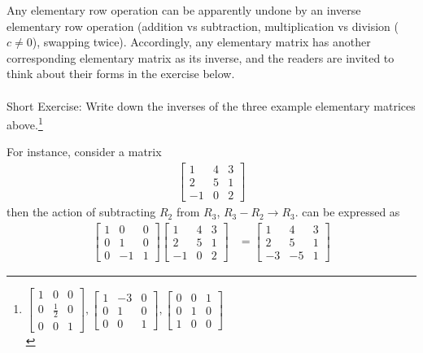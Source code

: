 Any elementary row operation can be apparently undone by an inverse elementary row operation (addition vs subtraction, multiplication vs division ($c \neq 0$), swapping twice). Accordingly, any elementary matrix has another corresponding elementary matrix as its inverse, and the readers are invited to think about their forms in the exercise below. \\
\\
Short Exercise: Write down the inverses of the three example elementary matrices above.\footnote{$
\begin{bmatrix}
1 & 0 & 0 \\
0 & \frac{1}{2} & 0 \\
0 & 0 & 1
\end{bmatrix},
\begin{bmatrix}
1 & -3 & 0 \\
0 & 1 & 0 \\
0 & 0 & 1
\end{bmatrix},
\begin{bmatrix}
0 & 0 & 1 \\
0 & 1 & 0 \\
1 & 0 & 0
\end{bmatrix}
$\\}\par
For instance, consider a matrix
\begin{align*}
\begin{bmatrix}
1 & 4 & 3 \\
2 & 5 & 1 \\
-1 & 0 & 2
\end{bmatrix}     
\end{align*}
then the action of subtracting $R_2$ from $R_3$, $R_3 - R_2 \to R_3$. can be expressed as
\begin{align*}
\begin{bmatrix}
1 & 0 & 0 \\
0 & 1 & 0 \\
0 & -1 & 1
\end{bmatrix} 
\begin{bmatrix}
1 & 4 & 3 \\
2 & 5 & 1 \\
-1 & 0 & 2
\end{bmatrix} 
&= 
\begin{bmatrix}
1 & 4 & 3 \\
2 & 5 & 1 \\
-3 & -5 & 1
\end{bmatrix} 
\end{align*}
